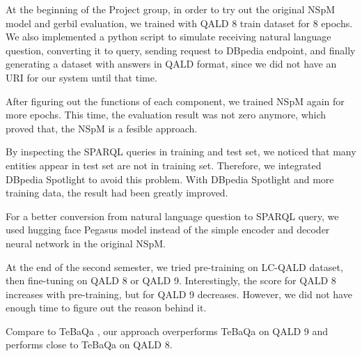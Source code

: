 At the beginning of the Project group,
in order to try out the original NSpM model and gerbil evaluation,
we trained with QALD 8 train dataset for 8 epochs. 
We also implemented a python script to simulate 
receiving natural language question, 
converting it to query,
sending request to DBpedia endpoint, 
and finally generating a dataset with answers in QALD format,
since we did not have an URI for our system until that time. 

After figuring out the functions of each component, 
we trained NSpM again for more epochs. 
This time, the evaluation result was not zero anymore, 
which proved that,
the NSpM is a fesible approach. 

By inspecting the SPARQL queries in training and test set, 
we noticed that
many entities appear in test set are not in training set. 
Therefore, we integrated DBpedia Spotlight to avoid this problem. 
With DBpedia Spotlight and more training data, 
the result had been greatly improved. 

For a better conversion from natural language question to SPARQL query, 
we used hugging face Pegasus model instead of the simple encoder and decoder neural network in the original NSpM.

At the end of the second semester, we tried pre-training on LC-QALD dataset, then fine-tuning on QALD 8 or QALD 9. 
Interestingly, the score for QALD 8 increases with pre-training, 
but for QALD 9 decreases. 
However, we did not have enough time to figure out the reason behind it. 

Compare to TeBaQa \cite{DBLP:journals/corr/abs-2103-06752},
our approach overperforms TeBaQa on QALD 9 and performs close to TeBaQa on QALD 8.
